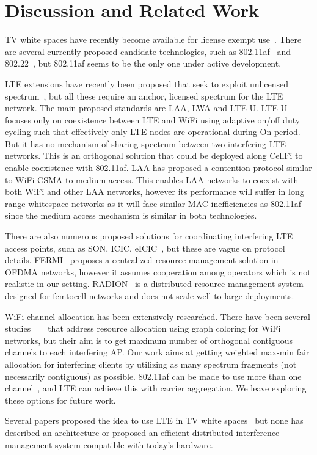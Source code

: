 \section{Discussion and Related Work}

TV white spaces have recently become available for license exempt use~\cite{fcc, etsi_tvws}. 
There are several currently proposed candidate technologies, such as 802.11af~\cite{Rice_af} and 802.22~\cite{wifi80222}, 
but 802.11af seems to be the only one under active development. 

LTE extensions have recently been proposed that seek to exploit unlicensed spectrum~\cite{qualcomm-lte-unlicensed,huawei-lte-unlicensed,ericsson-unlicensed}, but all these require an anchor, licensed spectrum for the LTE network.
The main proposed standards are LAA, LWA and LTE-U. 
LTE-U focuses only on coexistence between LTE and WiFi using adaptive on/off duty cycling such that effectively only LTE nodes are operational during On period. But it has no mechanism of sharing spectrum between two interfering LTE networks.
This is an orthogonal solution that could be deployed along CellFi to enable coexistence with 802.11af.
LAA has proposed a contention protocol similar to WiFi CSMA to medium access. This enables LAA networks to coexist with both WiFi and other LAA networks, however its performance will suffer in long range whitespace networks as it will face similar MAC inefficiencies as 802.11af since the medium access mechanism is similar in both technologies.


There are also numerous proposed solutions for coordinating interfering LTE access points, such as SON, ICIC, eICIC~\cite{smallcellbook}, 
but these are vague on protocol details. 
FERMI~\cite{fermi} proposes a centralized resource management solution in OFDMA networks, however it assumes cooperation among operators which is not realistic in our setting.
RADION~\cite{radion} is a distributed resource management system designed for femtocell networks and does not scale well to large deployments.

WiFi channel allocation has been extensively researched. 
There have been several studies ~\cite{client-deriven} ~\cite{load-aware} that address resource allocation using graph coloring for WiFi networks, but their aim is to get maximum number of orthogonal contiguous channels to each interfering AP. Our work aims at getting weighted max-min fair allocation for interfering clients by utilizing as many spectrum fragments (not necessarily contiguous) as possible.
\wf 802.11af can be made to use more than one channel~\cite{whitefi}, and  LTE can achieve this with carrier aggregation. We leave exploring these options for future work. 

Several papers proposed the idea to use LTE in TV white spaces~\cite{dyspan_lte12, radisys} but none has described an architecture or proposed an efficient distributed interference management system compatible with today's hardware. 


